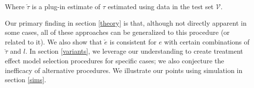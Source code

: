 Where $\check \tau$ is a plug-in estimate of $\tau$ estimated using data in the test set $\mathcal{V}$. 

Our primary finding in section \ref{theory} is that, although not directly apparent in some cases, all of these approaches can be generalized to this procedure (or related to it). We also show that $\check e$ is consistent for $e$ with certain combinations of $\check\tau$ and $l$. In section \ref{variants}, we leverage our understanding to create treatment effect model selection procedures for specific cases;  we also conjecture the inefficacy of alternative procedures. We illustrate our points using simulation in section \ref{sims}.
